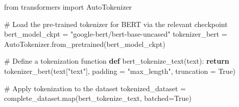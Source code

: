 \documentclass[
  letterpaper,
  DIV=11,
  numbers=noendperiod]{scrreprt}
\newenvironment{Shaded}{\begin{snugshade}}{\end{snugshade}}
\newcommand{\BuiltInTok}[1]{\textcolor[rgb]{0.00,0.23,0.31}{#1}}
\newcommand{\CommentTok}[1]{\textcolor[rgb]{0.37,0.37,0.37}{#1}}
\newcommand{\ControlFlowTok}[1]{\textcolor[rgb]{0.00,0.23,0.31}{\textbf{#1}}}
\newcommand{\ImportTok}[1]{\textcolor[rgb]{0.00,0.46,0.62}{#1}}
\newcommand{\KeywordTok}[1]{\textcolor[rgb]{0.00,0.23,0.31}{\textbf{#1}}}
\newcommand{\NormalTok}[1]{\textcolor[rgb]{0.00,0.23,0.31}{#1}}
\newcommand{\OperatorTok}[1]{\textcolor[rgb]{0.37,0.37,0.37}{#1}}
\newcommand{\StringTok}[1]{\textcolor[rgb]{0.13,0.47,0.30}{#1}}
\newcommand{\VariableTok}[1]{\textcolor[rgb]{0.07,0.07,0.07}{#1}}
\begin{document}
\begin{Shaded}
\begin{Highlighting}[]
\ImportTok{from}\NormalTok{ transformers }\ImportTok{import}\NormalTok{ AutoTokenizer}

\CommentTok{\# Load the pre{-}trained tokenizer for BERT via the relevant checkpoint}
\NormalTok{bert\_model\_ckpt }\OperatorTok{=} \StringTok{"google{-}bert/bert{-}base{-}uncased"}
\NormalTok{tokenizer\_bert }\OperatorTok{=}\NormalTok{ AutoTokenizer.from\_pretrained(bert\_model\_ckpt)}

\CommentTok{\# Define a tokenization function}
\KeywordTok{def}\NormalTok{ bert\_tokenize\_text(text):}
    \ControlFlowTok{return}\NormalTok{ tokenizer\_bert(text[}\StringTok{"text"}\NormalTok{], padding }\OperatorTok{=} \StringTok{"max\_length"}\NormalTok{, truncation }\OperatorTok{=} \VariableTok{True}\NormalTok{)}
  
\CommentTok{\# Apply tokenization to the dataset}
\NormalTok{tokenized\_dataset }\OperatorTok{=}\NormalTok{ complete\_dataset.}\BuiltInTok{map}\NormalTok{(bert\_tokenize\_text, batched}\OperatorTok{=}\VariableTok{True}\NormalTok{)}
\end{Highlighting}
\end{Shaded}
\end{document}
